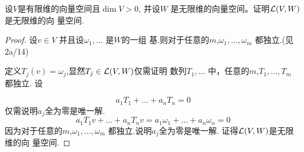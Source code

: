 \begin{problem}{12}
  设$V$是有限维的向量空间且$\dim V > 0 $, 并设$W$
  是无限维的向量空间。证明$\mathcal{L}(V,W)$是无限维的向
  量空间.
\end{problem}

\begin{proof}
  设$v\in V $ 并且设$\omega_1,\dots$ 是$W$的一组
  基.则对于任意的$m$,$\omega_1,\dots,\omega_m$
  都独立.(见2a/14)
  
  定义$T_j(v)=\omega_j$,显然$T_j\in\mathcal{L}(V,W)$仅需证明
  数列$T_1,\dots$ 中，任意的$m$,$T_1,\dots,T_m$
  都独立. 设
  
  \[
    a_1T_1+\dots+a_nT_n = 0
  \]
  仅需说明$a_j$全为零是唯一解.
  \[
    a_1T_1v+\dots+a_nT_nv = a_1\omega_1+\dots+a_n\omega_n =0
  \]
  因为对于任意的$m$,$\omega_1,\dots,\omega_m$
  都独立.说明$a_j$全为零是唯一解.
  证得$\mathcal{L}(V,W)$是无限维的向
  量空间.
\end{proof}

